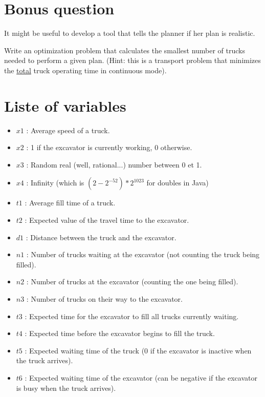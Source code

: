 \documentclass[letterpaper,12pt]{article}
\begin{document}
	
	\section*{Bonus question}
	It might be useful to develop a tool that tells the planner if her plan is realistic.
	
	Write an optimization problem that calculates the smallest number of trucks needed to perform a given plan. (Hint: this is a transport problem that minimizes the \underline{total} truck operating time in continuous mode).
	
	
	\section{Liste of variables}
	\label{sec:vars}
	
	
	\begin{itemize}
		\setlength\itemsep{0.01em}
		\item $x1$ : Average speed of a truck.
		\item $x2$ : 1 if the excavator is currently working, 0 otherwise.
		\item $x3$ : Random real (well, rational...) number between 0 et 1.
		\item $x4$ : Infinity (which is $(2-2^{-52})*2^{1023}$ for doubles in Java)
		\item $t1$ : Average fill time of a truck.
		\item $t2$ : Expected value of the travel time to the excavator.
		\item $d1$ : Distance between the truck and the excavator.
		\item $n1$ : Number of trucks waiting at the excavator (not counting the truck being filled).
		\item $n2$ : Number of trucks at the excavator (counting the one being filled).
		\item $n3$ : Number of trucks on their way to the excavator.
		\item $t3$ : Expected time for the excavator to fill all trucks currently waiting.
		\item $t4$ : Expected time before the excavator begins to fill the truck.
		\item $t5$ : Expected waiting time of the truck (0 if the excavator is inactive when the truck arrives).
		\item $t6$ : Expected waiting time of the excavator (can be negative if the excavator is busy when the truck arrives).
	\end{itemize}
	
	
	
\end{document}
